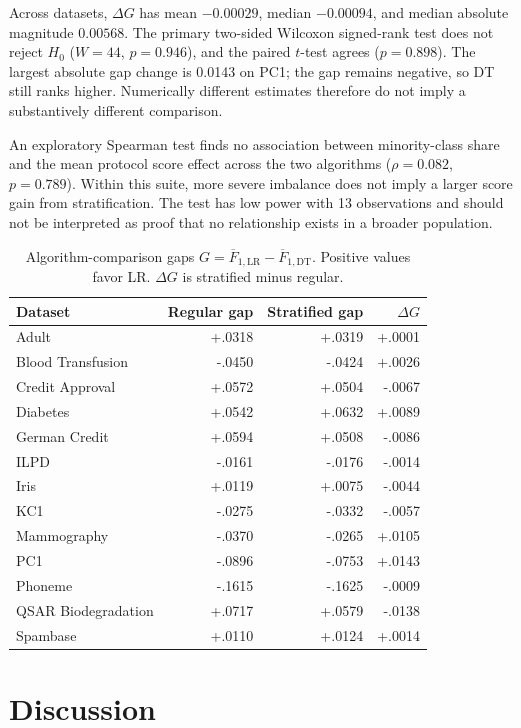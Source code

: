 \documentclass[twoside,11pt]{article}
\newcommand{\gap}{G}
\newcommand{\deltag}{\Delta G}
\begin{document}
Across datasets, $\deltag$ has mean $-0.00029$, median $-0.00094$, and median absolute magnitude $0.00568$. The primary two-sided Wilcoxon signed-rank test does not reject $H_0$ ($W=44$, $p=0.946$), and the paired $t$-test agrees ($p=0.898$). The largest absolute gap change is 0.0143 on PC1; the gap remains negative, so DT still ranks higher. Numerically different estimates therefore do not imply a substantively different comparison.

An exploratory Spearman test finds no association between minority-class share and the mean protocol score effect across the two algorithms ($\rho=0.082$, $p=0.789$). Within this suite, more severe imbalance does not imply a larger score gain from stratification. The test has low power with 13 observations and should not be interpreted as proof that no relationship exists in a broader population.

\begin{table}[t]
\centering
\caption{Algorithm-comparison gaps $\gap=\overline{F}_{1,\mathrm{LR}}-\overline{F}_{1,\mathrm{DT}}$. Positive values favor LR. $\deltag$ is stratified minus regular.}
\label{tab:gaps}
\small
\begin{tabular}{lrrr}
\toprule
Dataset & Regular gap & Stratified gap & $\deltag$ \\
\midrule
Adult & +.0318 & +.0319 & +.0001 \\
Blood Transfusion & -.0450 & -.0424 & +.0026 \\
Credit Approval & +.0572 & +.0504 & -.0067 \\
Diabetes & +.0542 & +.0632 & +.0089 \\
German Credit & +.0594 & +.0508 & -.0086 \\
ILPD & -.0161 & -.0176 & -.0014 \\
Iris & +.0119 & +.0075 & -.0044 \\
KC1 & -.0275 & -.0332 & -.0057 \\
Mammography & -.0370 & -.0265 & +.0105 \\
PC1 & -.0896 & -.0753 & +.0143 \\
Phoneme & -.1615 & -.1625 & -.0009 \\
QSAR Biodegradation & +.0717 & +.0579 & -.0138 \\
Spambase & +.0110 & +.0124 & +.0014 \\
\bottomrule
\end{tabular}
\end{table}

\section{Discussion}
\end{document}
